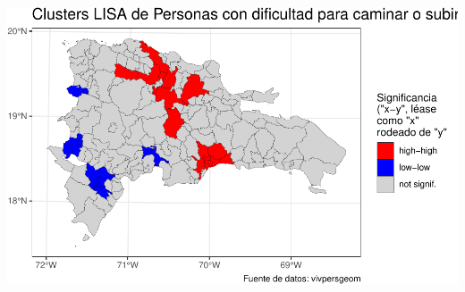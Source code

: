 \documentclass[11pt,]{article}
\begin{document}
\includegraphics[width=1\linewidth]{img/unnamed-chunk-10-2}
\end{document}
